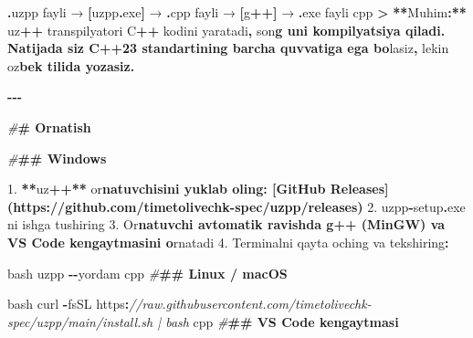 \documentclass[a4paper,11pt,twoside,openright]{book}
\newenvironment{Shaded}{\begin{snugshade}}{\end{snugshade}}
\newcommand{\CharTok}[1]{\textcolor[rgb]{0.31,0.60,0.02}{#1}}
\newcommand{\CommentTok}[1]{\textcolor[rgb]{0.56,0.35,0.01}{\textit{#1}}}
\newcommand{\ErrorTok}[1]{\textcolor[rgb]{0.64,0.00,0.00}{\textbf{#1}}}
\newcommand{\FloatTok}[1]{\textcolor[rgb]{0.00,0.00,0.81}{#1}}
\newcommand{\NormalTok}[1]{#1}
\newcommand{\OperatorTok}[1]{\textcolor[rgb]{0.81,0.36,0.00}{\textbf{#1}}}
\newcommand{\PreprocessorTok}[1]{\textcolor[rgb]{0.56,0.35,0.01}{\textit{#1}}}
\begin{document}
\begin{Shaded}
\begin{Highlighting}[]
\OperatorTok{.}\NormalTok{uzpp fayli  →  }\OperatorTok{[}\NormalTok{uzpp}\OperatorTok{.}\NormalTok{exe}\OperatorTok{]}\NormalTok{  →  }\OperatorTok{.}\NormalTok{cpp fayli  →  }\OperatorTok{[}\NormalTok{g}\OperatorTok{++]}\NormalTok{  →  }\OperatorTok{.}\NormalTok{exe fayli}
\ErrorTok{\textasciigrave{}\textasciigrave{}\textasciigrave{}}\NormalTok{cpp}
\OperatorTok{\textgreater{}} \OperatorTok{**}\NormalTok{Muhim}\OperatorTok{:**}\NormalTok{ uz}\OperatorTok{++}\NormalTok{ transpilyatori C}\OperatorTok{++}\NormalTok{ kodini yaratadi}\OperatorTok{,}\NormalTok{ so}\CharTok{\textquotesingle{}n}\ErrorTok{g uni kompilyatsiya qiladi. Natijada siz C++23 standartining barcha quvvatiga ega bo}\CharTok{\textquotesingle{}}\NormalTok{lasiz}\OperatorTok{,}\NormalTok{ lekin o}\CharTok{\textquotesingle{}z}\ErrorTok{bek tilida yozasiz.}

\OperatorTok{{-}{-}{-}}

\PreprocessorTok{\#}\ErrorTok{\# O\textquotesingle{}rnatish}

\PreprocessorTok{\#}\ErrorTok{\#\# Windows}

\FloatTok{1.} \OperatorTok{**}\NormalTok{uz}\OperatorTok{++**}\NormalTok{ o}\CharTok{\textquotesingle{}r}\ErrorTok{natuvchisini yuklab oling: [GitHub Releases](https://github.com/timetolivechk{-}spec/uzpp/releases)}
\FloatTok{2.} \ErrorTok{\textasciigrave{}}\NormalTok{uzpp}\OperatorTok{{-}}\NormalTok{setup}\OperatorTok{.}\NormalTok{exe}\ErrorTok{\textasciigrave{}}\NormalTok{ ni ishga tushiring}
\FloatTok{3.}\NormalTok{ O}\CharTok{\textquotesingle{}r}\ErrorTok{natuvchi avtomatik ravishda \textasciigrave{}g++\textasciigrave{} (MinGW) va VS Code kengaytmasini o}\CharTok{\textquotesingle{}}\NormalTok{rnatadi}
\FloatTok{4.}\NormalTok{ Terminalni qayta oching va tekshiring}\OperatorTok{:}

\ErrorTok{\textasciigrave{}\textasciigrave{}\textasciigrave{}}\NormalTok{bash}
\NormalTok{uzpp }\OperatorTok{{-}{-}}\NormalTok{yordam}
\ErrorTok{\textasciigrave{}\textasciigrave{}\textasciigrave{}}\NormalTok{cpp}
\PreprocessorTok{\#}\ErrorTok{\#\# Linux / macOS}

\ErrorTok{\textasciigrave{}\textasciigrave{}\textasciigrave{}}\NormalTok{bash}
\NormalTok{curl }\OperatorTok{{-}}\NormalTok{fsSL https}\OperatorTok{:}\CommentTok{//raw.githubusercontent.com/timetolivechk{-}spec/uzpp/main/install.sh | bash}
\ErrorTok{\textasciigrave{}\textasciigrave{}\textasciigrave{}}\NormalTok{cpp}
\PreprocessorTok{\#}\ErrorTok{\#\# VS Code kengaytmasi}


\end{Highlighting}
\end{Shaded}
\end{document}

